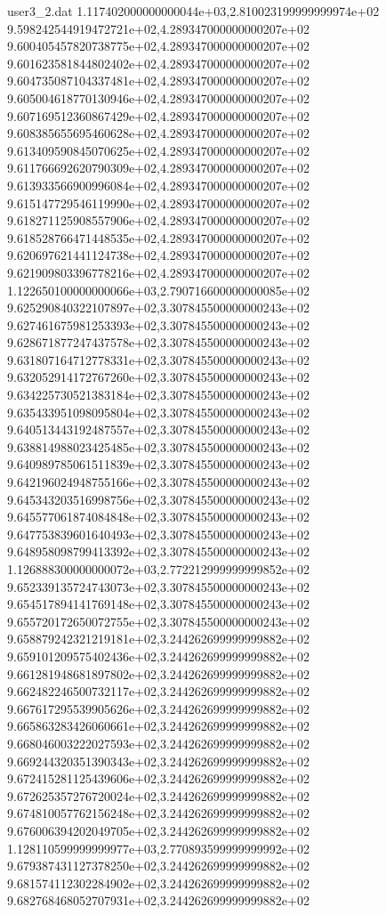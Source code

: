 \begin{filecontents}{user3_2.dat}
1.117402000000000044e+03,2.810023199999999974e+02
9.598242544919472721e+02,4.289347000000000207e+02
9.600405457820738775e+02,4.289347000000000207e+02
9.601623581844802402e+02,4.289347000000000207e+02
9.604735087104337481e+02,4.289347000000000207e+02
9.605004618770130946e+02,4.289347000000000207e+02
9.607169512360867429e+02,4.289347000000000207e+02
9.608385655695460628e+02,4.289347000000000207e+02
9.613409590845070625e+02,4.289347000000000207e+02
9.611766692620790309e+02,4.289347000000000207e+02
9.613933566900996084e+02,4.289347000000000207e+02
9.615147729546119990e+02,4.289347000000000207e+02
9.618271125908557906e+02,4.289347000000000207e+02
9.618528766471448535e+02,4.289347000000000207e+02
9.620697621441124738e+02,4.289347000000000207e+02
9.621909803396778216e+02,4.289347000000000207e+02
1.122650100000000066e+03,2.790716600000000085e+02
9.625290840322107897e+02,3.307845500000000243e+02
9.627461675981253393e+02,3.307845500000000243e+02
9.628671877247437578e+02,3.307845500000000243e+02
9.631807164712778331e+02,3.307845500000000243e+02
9.632052914172767260e+02,3.307845500000000243e+02
9.634225730521383184e+02,3.307845500000000243e+02
9.635433951098095804e+02,3.307845500000000243e+02
9.640513443192487557e+02,3.307845500000000243e+02
9.638814988023425485e+02,3.307845500000000243e+02
9.640989785061511839e+02,3.307845500000000243e+02
9.642196024948755166e+02,3.307845500000000243e+02
9.645343203516998756e+02,3.307845500000000243e+02
9.645577061874084848e+02,3.307845500000000243e+02
9.647753839601640493e+02,3.307845500000000243e+02
9.648958098799413392e+02,3.307845500000000243e+02
1.126888300000000072e+03,2.772212999999999852e+02
9.652339135724743073e+02,3.307845500000000243e+02
9.654517894141769148e+02,3.307845500000000243e+02
9.655720172650072755e+02,3.307845500000000243e+02
9.658879242321219181e+02,3.244262699999999882e+02
9.659101209575402436e+02,3.244262699999999882e+02
9.661281948681897802e+02,3.244262699999999882e+02
9.662482246500732117e+02,3.244262699999999882e+02
9.667617295539905626e+02,3.244262699999999882e+02
9.665863283426060661e+02,3.244262699999999882e+02
9.668046003222027593e+02,3.244262699999999882e+02
9.669244320351390343e+02,3.244262699999999882e+02
9.672415281125439606e+02,3.244262699999999882e+02
9.672625357276720024e+02,3.244262699999999882e+02
9.674810057762156248e+02,3.244262699999999882e+02
9.676006394202049705e+02,3.244262699999999882e+02
1.128110599999999977e+03,2.770893599999999992e+02
9.679387431127378250e+02,3.244262699999999882e+02
9.681574112302284902e+02,3.244262699999999882e+02
9.682768468052707931e+02,3.244262699999999882e+02

\end{filecontents}
